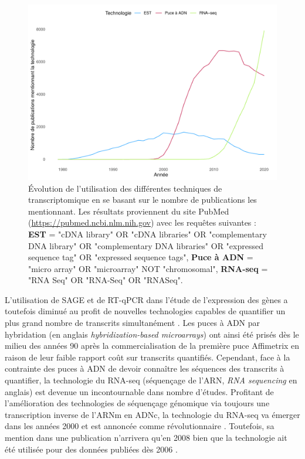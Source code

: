 \begin{figure}[!ht]
    \centering
    \includegraphics[width=\textwidth]{img/intro/2_meth_transcripto/intro_2_count_by_year_rnaseq_microarray_est.pdf}
    \caption[Évolution de l'utilisation des différentes techniques de transcriptomique en se basant sur le nombre de publications les mentionnant]{Évolution de l'utilisation des différentes techniques de transcriptomique en se basant sur le nombre de publications les mentionnant. Les résultats proviennent du site PubMed (\url{https://pubmed.ncbi.nlm.nih.gov}) avec les requêtes suivantes : \textbf{EST} = "cDNA library" OR "cDNA libraries" OR "complementary DNA library" OR "complementary DNA libraries" OR "expressed sequence tag" OR "expressed sequence tags", \textbf{Puce à ADN} = "micro array" OR "microarray" NOT "chromosomal", \textbf{RNA-seq} = "RNA Seq" OR "RNA-Seq" OR "RNASeq".}
    \label{fig:intro_count_by_year_rnaseq_microarray_est}
\end{figure}


L'utilisation de SAGE et de RT-qPCR dans l'étude de l'expression des gènes a toutefois diminué au profit de nouvelles technologies capables de quantifier un plus grand nombre de transcrits simultanément \cite{Lowe2017May}. Les puces à ADN par hybridation (en anglais \textit{hybridization-based microarrays}) ont ainsi été prisés dès le milieu des années 90 \cite{Schena1995Oct} après la commercialisation de la première puce Affimetrix \cite{Lenoir2006} en raison de leur faible rapport coût sur transcrits quantifiés. Cependant, face à la contrainte des puces à ADN de devoir connaître les séquences des transcrits à quantifier, la technologie du RNA-seq  (séquençage de l'ARN, \textit{RNA sequencing} en anglais) est devenue un incontournable dans nombre d'études. 
Profitant de l'amélioration des technologies de séquençage génomique via toujours une transcription inverse de l'ARNm en ADNc, la technologie du RNA-seq va émerger dans les années 2000 et est annoncée comme révolutionnaire \cite{Wang2009Jan}. Toutefois, sa mention dans une publication n'arrivera qu'en 2008 \cite{Nagalakshmi2008Jun} bien que la technologie ait été utilisée pour des données publiées dès 2006 \cite{Cheung2006Dec}.

